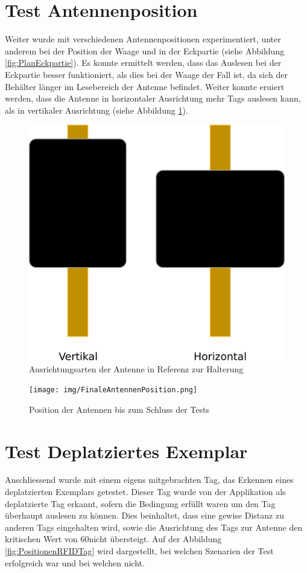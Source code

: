 \documentclass[parskip=full, a4paper]{scrartcl}
\begin{document}
\section{Test Antennenposition}
Weiter wurde mit verschiedenen Antennenpositionen experimentiert, unter anderem bei der Position der Waage und in der Eckpartie (siehe Abbildung \ref{fig:PlanEckpartie}). Es konnte ermittelt werden, dass das Auslesen bei der Eckpartie besser funktioniert, als dies bei der Waage der Fall ist, da sich der Behälter länger im Lesebereich der Antenne befindet. Weiter konnte eruiert werden, dass die Antenne in horizontaler Ausrichtung mehr Tags auslesen kann, als in vertikaler Ausrichtung (siehe Abbildung \ref{fig:AusrichtungAntenne}).

\begin{figure}[htb]
	\centering
	\includegraphics[keepaspectratio,width=0.6\linewidth]{img/AusrichtungAntenne.png}
	\caption{Ausrichtungsarten der Antenne in Referenz zur Halterung}
	\label{fig:AusrichtungAntenne}
\end{figure}

\begin{figure}[htb]
	\centering
	\texttt{[image: img/FinaleAntennenPosition.png]}
	\caption{Position der Antennen bis zum Schluss der Tests}
	\label{fig:FinalePositionAntennen}
\end{figure}

\section{Test Deplatziertes Exemplar}
Anschliessend wurde mit einem eigens mitgebrachten Tag, das Erkennen eines deplatzierten Exemplars getestet. Dieser Tag wurde von der Applikation als deplatzierte Tag erkannt, sofern die Bedingung erfüllt waren um den Tag überhaupt auslesen zu können. Dies beinhaltet, dass eine gewise Distanz zu anderen Tags eingehalten wird, sowie die Ausrichtung des Tags zur Antenne den kritischen Wert von 60\SIUnitSymbolDegree nicht übersteigt. Auf der Abbildung \ref{fig:PositionenRFIDTag} wird dargestellt, bei welchen Szenarien der Test erfolgreich war und bei welchen nicht.
\end{document}
